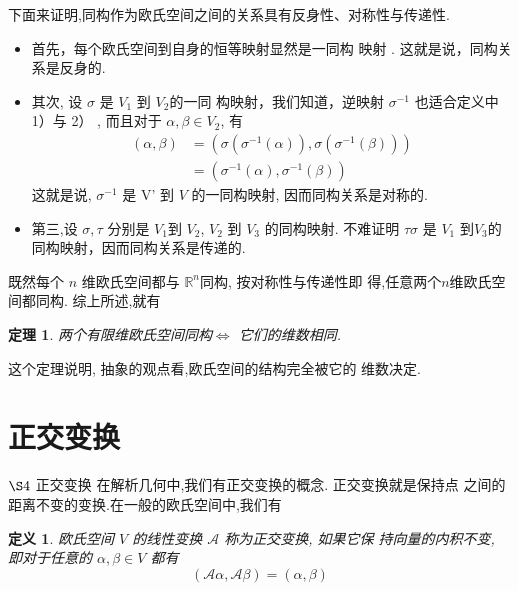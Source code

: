 \documentclass[13pt]{beamer}
\newtheorem{thm}{定理}
\newtheorem*{defi}{定义}
\begin{document}
\begin{frame}
下面来证明,同构作为欧氏空间之间的关系具有反身性、对称性与传递性.

\begin{itemize}
\item  首先，每个欧氏空间到自身的恒等映射显然是一同构 映射 . 这就是说，同构关系是反身的.

\item 其次, 设 $\sigma$ 是 $V_1$ 到 $V_2$的一同 构映射，我们知道，逆映射 $\sigma^{-1}$ 也适合定义中 1）与 2） , 而且对于 ${\alpha}, {\beta} \in V_2$, 有
$$
\begin{aligned}
	({\alpha}, {\beta}) &=\left(\sigma\left(\sigma^{-1}({\alpha})\right), \sigma\left(\sigma^{-1}({\beta})\right)\right) \\
	&=\left(\sigma^{-1}({\alpha}), \sigma^{-1}({\beta})\right)
\end{aligned}
$$
这就是说, $\sigma^{-1}$ 是 V' 到 $V$ 的一同构映射, 因而同构关系是对称的. 

\item 第三,设 $\sigma, \tau$ 分别是 $V_1$到 $V_2$, $V_2$ 到 $V_3$ 的同构映射. 不难证明 $\tau \sigma$ 是 $V_1$ 到$V_3$的同构映射，因而同构关系是传递的.
\end{itemize}

\end{frame}


\begin{frame}

 既然每个 $n$ 维欧氏空间都与 $\mathbb{R}^n$同构, 按对称性与传递性即
得,任意两个$n$维欧氏空间都同构.
综上所述,就有 
\begin{thm}
两个有限维欧氏空间同构$\Longleftrightarrow$ 它们的维数相同.
\end{thm}
这个定理说明, 抽象的观点看,欧氏空间的结构完全被它的 维数决定.

\end{frame}


\section{正交变换}
\begin{frame}{$\S 4$ 正交变换}
在解析几何中,我们有正交变换的概念.
正交变换就是保持点 之间的距离不变的变换.在一般的欧氏空间中,我们有 
\begin{defi}
欧氏空间 $V$ 的线性变换 $\mathscr{A}$
称为正交变换, 如果它保 持向量的内积不变,
即对于任意的 ${\alpha}, {\beta} \in V$ 都有 $$(\mathscr{A} {\alpha}, \mathscr{A} {\beta})=({\alpha}, {\beta})$$
\end{defi}
\end{frame}
\end{document}
